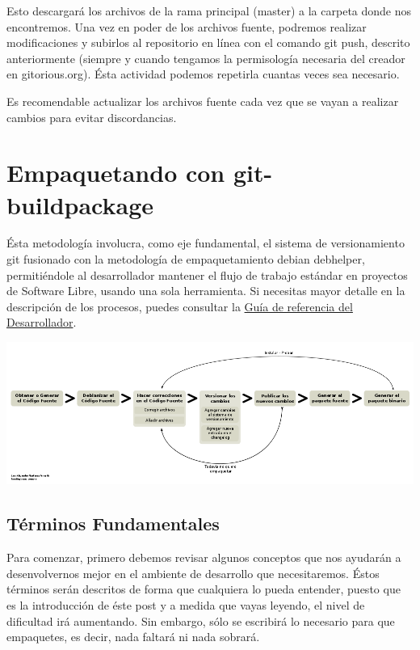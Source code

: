 \documentclass[letterpaper,12pt,spanish]{manual}
\begin{document}
Esto descargará los archivos de la rama principal (master) a la carpeta donde nos encontremos. Una vez en poder de los archivos fuente, podremos realizar modificaciones y subirlos al repositorio en línea con el comando git push, descrito anteriormente (siempre y cuando tengamos la permisología necesaria del creador en gitorious.org). Ésta actividad podemos repetirla cuantas veces sea necesario.

Es recomendable actualizar los archivos fuente cada vez que se vayan a realizar cambios para evitar discordancias.


\section{\textbf{Empaquetando con git-buildpackage}}

Ésta metodología involucra, como eje fundamental, el sistema de versionamiento git fusionado con la metodología de empaquetamiento debian debhelper, permitiéndole al desarrollador mantener el flujo de trabajo estándar en proyectos de Software Libre, usando una sola herramienta. Si necesitas mayor detalle en la descripción de los procesos, puedes consultar la \href{http://wiki.canaima.softwarelibre.gob.ve/wiki/Guía\_de\_Referencia\_para\_el\_Desarrollador}{Guía de referencia del Desarrollador}.

\includegraphics{diagrama2.png}


\subsection{Términos Fundamentales}

Para comenzar, primero debemos revisar algunos conceptos que nos ayudarán a desenvolvernos mejor en el ambiente de desarrollo que necesitaremos. Éstos términos serán descritos de forma que cualquiera lo pueda entender, puesto que es la introducción de éste post y a medida que vayas leyendo, el nivel de dificultad irá aumentando. Sin embargo, sólo se escribirá lo necesario para que empaquetes, es decir, nada faltará ni nada sobrará.
\end{document}

